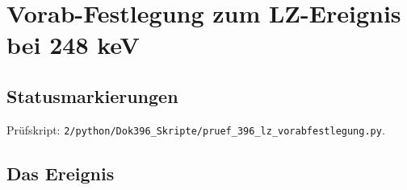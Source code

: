 
\providecommand{\BM}{\textbf{[B]}}
\providecommand{\KM}{\textbf{[K]}}
\providecommand{\SM}{\textbf{[S]}}
\providecommand{\XM}{\textbf{[X]}}
\providecommand{\QM}{\textbf{[Q]}}

\chapter*{Vorab-Festlegung zum LZ-Ereignis bei 248 keV}

\begin{abstract}
Der Xenon-Detektor LZ hat im September 2026 ein einzelnes Ereignis veröffentlicht, das nach allen
geprüften Kriterien wie der Stoß eines schweren Teilchens gegen einen Xenonkern aussieht, mit rund
248\,keV Rückstoßenergie, bei einem erwarteten Untergrund von etwa einem Hundertstel Ereignis. Die
globale Signifikanz beträgt 2{,}6\,$\sigma$; die Analyse ist nach Angabe der Kollaboration nicht
blind. In der FFGFT ist Dunkle Materie kein Stoff, sondern das Regime unterhalb der
Beschleunigungsskala $a_0$, in dem die Trägheit nichtlinear ist (Dok.~308). Ein direkter Nachweis
eines Dunkle-Materie-Teilchens ist deshalb ein Falsifikationskriterium dieser Lesart. Dieses
Dokument legt, bevor weitere Daten ausgewertet sind, fest, was die FFGFT für LZ erwartet und was sie
widerlegen würde: keine Häufung solcher Ereignisse und keine Jahresmodulation mit Maximum Anfang
Juni. Ein bestätigter Überschuss mit dieser Modulation würde die Lesart widerlegen. Der Ausweg, ein
solches Teilchen könne existieren, ohne die Rotationskurven zu tragen, wird ausdrücklich nicht in
Anspruch genommen.
\end{abstract}

\section*{Statusmarkierungen}

Prüfskript: \texttt{2/python/Dok396\_Skripte/pruef\_396\_lz\_vorabfestlegung.py}.

\section{Das Ereignis}

